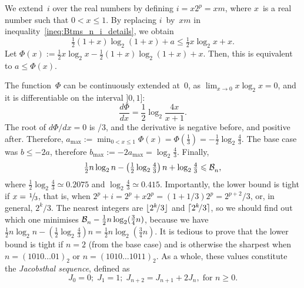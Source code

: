 We extend~\(i\) over the real numbers by defining \(i=x2^p=xm\), where
\(x\)~is a real number such that \(0 < x \leqslant 1\). By replacing
\(i\)~by~\(xm\) in inequality~\eqref{ineq:Btms_n_i_details}, we obtain
\begin{equation*}
\tfrac{1}{2}(1+x)\log_2(1+x) + a \leqslant \tfrac{1}{2}x\log_2 x + x.
\end{equation*}
Let \(\Phi(x) := \tfrac{1}{2}x\log_2 x - \tfrac{1}{2}(1+x)\log_2(1+x)
+ x\). Then, this is equivalent to \(a \leqslant \Phi(x)\).

The function~\(\Phi\) can be continuously extended at~\(0\), as
\(\lim_{x \to 0} x\log_2 x = 0\), and it is differentiable on the
interval \(]0,1]\):
\begin{equation}
\frac{d\Phi}{dx} = \frac{1}{2}\log_2\frac{4x}{x+1}.
\label{eq:der_Phi}
\end{equation}
The root of \(d\Phi/dx = 0\) is /{3}, and the derivative
is negative before, and positive after. Therefore, \(a_{\max} :=
\min_{0 < x \leqslant 1}\Phi(x) = \Phi(\tfrac{1}{3}) =
-\tfrac{1}{2}\log_2\tfrac{4}{3}\). The base case was \(b \leqslant -2a\),
therefore \(b_{\max} := -2a_{\max} = \log_2\tfrac{4}{3}\). Finally,
\begin{equation}
  \tfrac{1}{2}n\log_2 n - \left(\tfrac{1}{2}\log_2\tfrac{4}{3}\right)n + \log_2\tfrac{4}{3}
  \leqslant \mathcal{B}_{n}^{},
\label{ineq:lower_Btms}
\end{equation}
where \(\tfrac{1}{2}\log_2\tfrac{4}{3} \simeq 0.2075\) and
\(\log_2\tfrac{4}{3} \simeq 0.415\). Importantly, the lower bound is
tight if \(x=\myfrac{1}/{3}\), that is, when
\(2^p+i=2^p+x2^p=(1+1/3)2^p=2^{p+2}\!/3\), or, in general,
\(2^k\!/3\). The nearest integers are \(\lfloor{2^k\!/3}\rfloor\) and
\(\lceil{2^k\!/3}\rceil\), so we should find out which one minimises
\(\mathcal{B}_{n}^{} - \tfrac{1}{2}n\log_2(\tfrac{3}{4}n)\), because we have
\(\tfrac{1}{2}n\log_2 n - \left(\tfrac{1}{2}\log_2\tfrac{4}{3}\right)n =
\tfrac{1}{2}n\log_2(\tfrac{3}{4}n)\). It is tedious to prove that the
lower bound is tight if \(n=2\) (from the base case) and is otherwise
the sharpest when \(n=(1010\dots01)_2\) or \(n=(1010\dots1011)_2\). As
a whole, these values constitute the \emph{Jacobsthal sequence},
defined as
\begin{equation*}
J_0 = 0; \; J_1=1; \; J_{n+2} = J_{n+1} + 2J_{n},\; \text{for \(n
  \geqslant 0\).}
\end{equation*}

